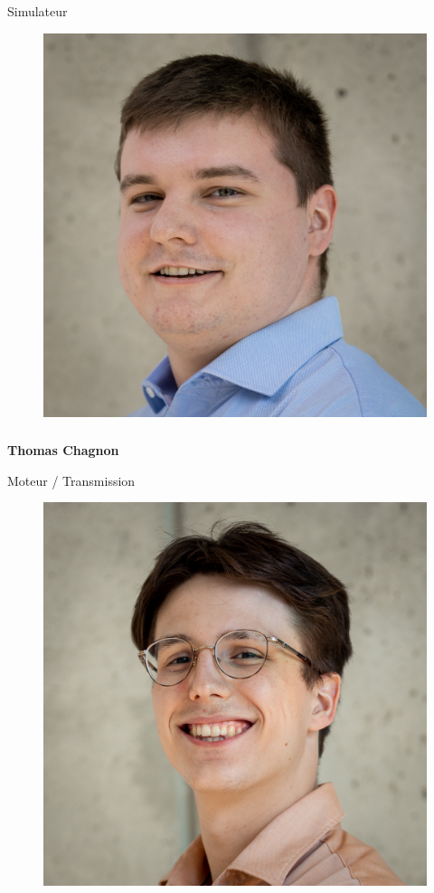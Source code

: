 \documentclass[a0paper,portrait]{baposter}
\begin{document}
\begin{poster}
{Simulateur

\begin{figure}
\includegraphics[width=.9\linewidth]{img/membres/Thomas-Chagnon-3.jpg} 
\end{figure}
\subsubsection*{}
\vspace{2mm}
\textbf{Thomas Chagnon}

Moteur / Transmission

\begin{figure}
\includegraphics[width=.9\linewidth]{img/membres/Vincent-Bonneau-3.jpg} 
\end{figure}
}
\end{poster}
\end{document}
